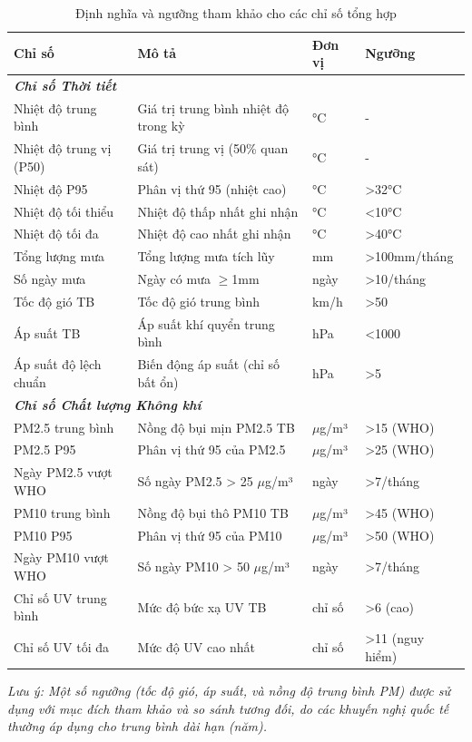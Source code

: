 \documentclass[12pt,a4paper]{article}
\begin{document}
\begin{table}[H]
\centering
\small
\begin{tabular}{p{4cm}p{5.5cm}p{1.8cm}p{2.2cm}}
\toprule
\textbf{Chỉ số} & \textbf{Mô tả} & \textbf{Đơn vị} & \textbf{Ngưỡng} \\
\midrule
\multicolumn{4}{l}{\textit{\textbf{Chỉ số Thời tiết}}} \\
\midrule
Nhiệt độ trung bình & Giá trị trung bình nhiệt độ trong kỳ & °C & - \\
Nhiệt độ trung vị (P50) & Giá trị trung vị (50\% quan sát) & °C & - \\
Nhiệt độ P95 & Phân vị thứ 95 (nhiệt cao) & °C & >32°C \\
Nhiệt độ tối thiểu & Nhiệt độ thấp nhất ghi nhận & °C & <10°C \\
Nhiệt độ tối đa & Nhiệt độ cao nhất ghi nhận & °C & >40°C \\
\midrule
Tổng lượng mưa & Tổng lượng mưa tích lũy & mm & >100mm/tháng \\
Số ngày mưa & Ngày có mưa $\geq$1mm & ngày & >10/tháng \\
\midrule
Tốc độ gió TB & Tốc độ gió trung bình & km/h & >50 \\
\midrule
Áp suất TB & Áp suất khí quyển trung bình & hPa & <1000 \\
Áp suất độ lệch chuẩn & Biến động áp suất (chỉ số bất ổn) & hPa & >5 \\
\midrule
\multicolumn{4}{l}{\textit{\textbf{Chỉ số Chất lượng Không khí}}} \\
\midrule
PM2.5 trung bình & Nồng độ bụi mịn PM2.5 TB & $\mu$g/m³ & >15 (WHO) \\
PM2.5 P95 & Phân vị thứ 95 của PM2.5 & $\mu$g/m³ & >25 (WHO) \\
Ngày PM2.5 vượt WHO & Số ngày PM2.5 > 25 $\mu$g/m³ & ngày & >7/tháng \\
\midrule
PM10 trung bình & Nồng độ bụi thô PM10 TB & $\mu$g/m³ & >45 (WHO) \\
PM10 P95 & Phân vị thứ 95 của PM10 & $\mu$g/m³ & >50 (WHO) \\
Ngày PM10 vượt WHO & Số ngày PM10 > 50 $\mu$g/m³ & ngày & >7/tháng \\
\midrule
Chỉ số UV trung bình & Mức độ bức xạ UV TB & chỉ số & >6 (cao) \\
Chỉ số UV tối đa & Mức độ UV cao nhất & chỉ số & >11 (nguy hiểm) \\
\bottomrule
\end{tabular}
\caption{Định nghĩa và ngưỡng tham khảo cho các chỉ số tổng hợp}
\label{tab:indicators}
\end{table}
\textit{\small Lưu ý: Một số ngưỡng (tốc độ gió, áp suất, và nồng độ trung bình PM) được sử dụng với mục đích tham khảo và so sánh tương đối, do các khuyến nghị quốc tế thường áp dụng cho trung bình dài hạn (năm).}
\end{document}
